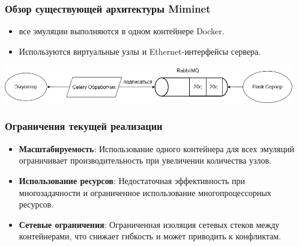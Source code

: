 \documentclass{beamer}
\begin{document}

\begin{frame}[fragile]
  \frametitle{Обзор существующей архитектуры Miminet}
  \begin{itemize}
    \item все эмуляции выполняются в одном контейнере Docker.
    \item Используются виртуальные узлы и Ethernet-интерфейсы сервера.
  \end{itemize}
  \begin{center}
    \includegraphics[width=0.95\textwidth, keepaspectratio]{seq2.png}
  \end{center}

\end{frame}



\begin{frame}[fragile]
  \frametitle{Ограничения текущей реализации}
  \begin{itemize}
    \item \textbf{Масштабируемость}: Использование одного контейнера для всех эмуляций ограничивает производительность при увеличении количества узлов.
    \item \textbf{Использование ресурсов}: Недостаточная эффективность при многозадачности и ограниченное использование многопроцессорных ресурсов.
    \item \textbf{Сетевые ограничения}: Ограниченная изоляция сетевых стеков между контейнерами, что снижает гибкость и может приводить к конфликтам.
  \end{itemize}
\end{frame}
\end{document}
